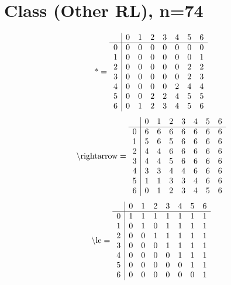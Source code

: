 \documentclass[11pt]{article}
\begin{document}
\section{Class (Other RL), n=74}
\[\text{*} = 
\begin{array}{r | r r r r r r r}
 & 0 & 1 & 2 & 3 & 4 & 5 & 6 \\ \hline
0 & 0 & 0 & 0 & 0 & 0 & 0 & 0 \\
1 & 0 & 0 & 0 & 0 & 0 & 0 & 1 \\
2 & 0 & 0 & 0 & 0 & 0 & 2 & 2 \\
3 & 0 & 0 & 0 & 0 & 0 & 2 & 3 \\
4 & 0 & 0 & 0 & 0 & 2 & 4 & 4 \\
5 & 0 & 0 & 2 & 2 & 4 & 5 & 5 \\
6 & 0 & 1 & 2 & 3 & 4 & 5 & 6 \\
\end{array}
\]
\[\text{\textbackslash rightarrow} = 
\begin{array}{r | r r r r r r r}
 & 0 & 1 & 2 & 3 & 4 & 5 & 6 \\ \hline
0 & 6 & 6 & 6 & 6 & 6 & 6 & 6 \\
1 & 5 & 6 & 5 & 6 & 6 & 6 & 6 \\
2 & 4 & 4 & 6 & 6 & 6 & 6 & 6 \\
3 & 4 & 4 & 5 & 6 & 6 & 6 & 6 \\
4 & 3 & 3 & 4 & 4 & 6 & 6 & 6 \\
5 & 1 & 1 & 3 & 3 & 4 & 6 & 6 \\
6 & 0 & 1 & 2 & 3 & 4 & 5 & 6 \\
\end{array}
\]
\[\text{\textbackslash le} = 
\begin{array}{r | r r r r r r r}
 & 0 & 1 & 2 & 3 & 4 & 5 & 6 \\ \hline
0 & 1 & 1 & 1 & 1 & 1 & 1 & 1 \\
1 & 0 & 1 & 0 & 1 & 1 & 1 & 1 \\
2 & 0 & 0 & 1 & 1 & 1 & 1 & 1 \\
3 & 0 & 0 & 0 & 1 & 1 & 1 & 1 \\
4 & 0 & 0 & 0 & 0 & 1 & 1 & 1 \\
5 & 0 & 0 & 0 & 0 & 0 & 1 & 1 \\
6 & 0 & 0 & 0 & 0 & 0 & 0 & 1 \\
\end{array}
\]
\end{document}
